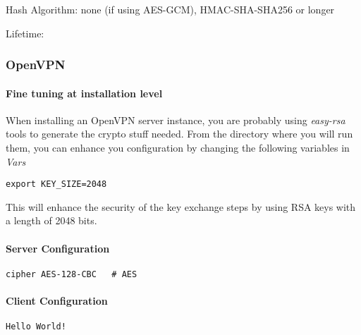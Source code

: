 Hash Algorithm: none (if using AES-GCM), HMAC-SHA-SHA256 or longer

Lifetime: 


\subsubsection{OpenVPN}

\paragraph{Fine tuning at installation level}

When installing an OpenVPN server instance, you are probably using {\it easy-rsa} tools to generate the crypto stuff needed.
From the directory where you will run them, you can enhance you configuration by changing the following variables in {\it Vars}

\begin{lstlisting}[breaklines]
export KEY_SIZE=2048 
\end{lstlisting}

This will enhance the security of the key exchange steps by using RSA keys with a length of 2048 bits.



\paragraph{Server Configuration}


\begin{lstlisting}[breaklines]
cipher AES-128-CBC   # AES
\end{lstlisting}


\paragraph{Client Configuration}


\begin{lstlisting}[breaklines]
Hello World!
\end{lstlisting}



